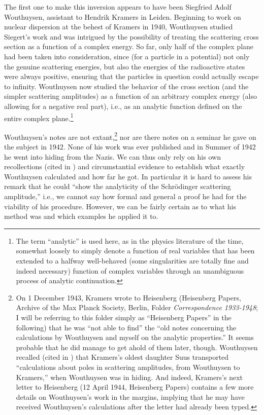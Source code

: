 \documentclass[12pt]{article}
\begin{document}
The first one to make this inversion appears to have been Siegfried Adolf Wouthuysen, assistant to Hendrik Kramers in Leiden. Beginning to work on nuclear dispersion at the behest of Kramers in 1940, Wouthuysen studied Siegert's work and was intrigued by the possibility of treating the scattering cross section as a function of a complex energy. So far, only half of the complex plane had been taken into consideration, since (for a particle in a potential) not only the genuine scattering energies, but also the energies of the radioactive states were always positive, ensuring that the particles in question could actually escape to infinity. Wouthuysen now studied the behavior of the cross section (and the simpler scattering amplitudes) as a function of an arbitrary complex energy (also allowing for a negative real part), i.e., as an analytic function defined on the entire complex plane.\footnote{The term ``analytic'' is used here, as in the physics literature of the time, somewhat loosely to simply denote a function of real variables that has been extended to a halfway well-behaved (some singularities are totally fine and indeed necessary) function of complex variables through an unambiguous process of analytic continuation.}

Wouthuysen's notes are not extant,\footnote{On 1 December 1943, Kramers wrote to Heisenberg (Heisenberg Papers, Archive of the Max Planck Society, Berlin, Folder \emph{Correspondence 1933-1948}; I will be referring to this folder simply as ``Heisenberg Papers'' in the following) that he was ``not able to find'' the ``old notes concerning the calculations by Wouthuysen and myself on the analytic properties.'' It seems probable that he did manage to get ahold of them later, though. Wouthuysen recalled (cited in \citep[p. 454]{dresden_1987_h}) that Kramers's oldest daughter Suus transported ``calculations about poles in scattering amplitudes, from Wouthuysen to Kramers,'' when Wouthuysen was in hiding. And indeed, Kramers's next letter to Heisenberg (12 April 1944, Heisenberg Papers) contains a few more details on Wouthuysen's work in the margins, implying that he may have received Wouthuysen's calculations after the letter had already been typed.} nor are there notes on a seminar he gave on the subject in 1942. None of his work was ever published and in Summer of 1942 he went into hiding from the Nazis. We can thus only rely on his own recollections (cited in \citep[p.38-39]{cushing_1990_theory}) and circumstantial evidence to establish what exactly Wouthuysen calculated and how far he got. In particular it is hard to assess his remark that he could ``show the analyticity of the Schr\"{o}dinger scattering amplitude,'' i.e., we cannot say how formal and general a proof he had for the viability of his procedure. However, we can be fairly certain as to what his method was and which examples he applied it to.
\end{document}
